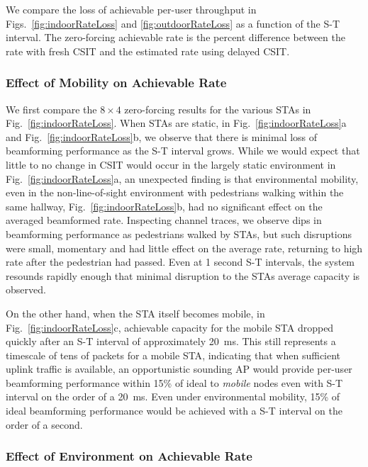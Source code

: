 	We compare the loss of achievable per-user throughput in Figs.~\ref{fig:indoorRateLoss} and \ref{fig:outdoorRateLoss} as a function of the S-T interval.
 The zero-forcing achievable rate is the percent difference between the rate with fresh \ac{CSIT} and the estimated rate using delayed \ac{CSIT}.

\subsubsection{Effect of Mobility on Achievable Rate}

	We first compare the $8\times4$ zero-forcing results for the various \acp{STA} in Fig.~\ref{fig:indoorRateLoss}.
	When \acp{STA} are static, in Fig.~\ref{fig:indoorRateLoss}a and Fig.~\ref{fig:indoorRateLoss}b, we observe that there is minimal loss of beamforming performance as the S-T interval grows.  While we would expect that little to no change in \ac{CSIT} would occur in the largely static environment in Fig.~\ref{fig:indoorRateLoss}a, an unexpected finding is that environmental mobility, even in the non-line-of-sight environment with pedestrians walking within the same hallway, Fig.~\ref{fig:indoorRateLoss}b, had no significant effect on the averaged beamformed rate.
	Inspecting channel traces, we observe dips in beamforming performance as pedestrians walked by \acp{STA}, but such disruptions were small, momentary and had little effect on the average rate, returning to high rate after the pedestrian had passed.
	Even at 1 second S-T intervals, the system resounds rapidly enough that minimal disruption to the \acp{STA} average capacity is observed.
	
	On the other hand, when the \ac{STA} itself becomes mobile, in Fig.~\ref{fig:indoorRateLoss}c, achievable capacity for the mobile \ac{STA} dropped quickly after an S-T interval of approximately 20~ms.
	This still represents a timescale of tens of packets for a mobile \ac{STA}, indicating that when sufficient uplink traffic is available, an opportunistic sounding \ac{AP} would provide per-user beamforming performance within 15\% of ideal to \textit{mobile} nodes even with S-T interval on the order of a 20~ms. Even under environmental mobility, 15\% of ideal beamforming performance would be achieved with a S-T interval on the order of a second.

\subsubsection{Effect of Environment on Achievable Rate}

